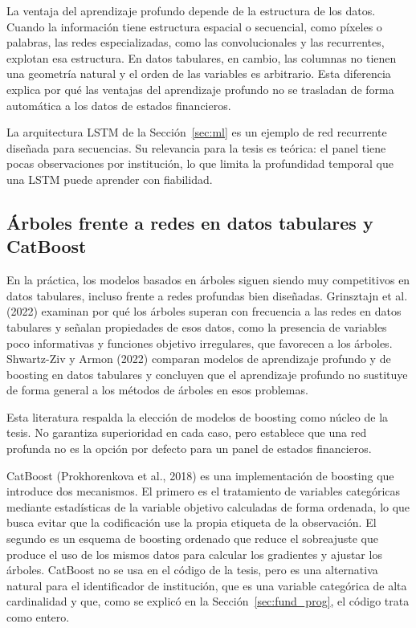 La ventaja del aprendizaje profundo depende de la estructura de los datos. Cuando la información tiene estructura espacial o secuencial, como píxeles o palabras, las redes especializadas, como las convolucionales y las recurrentes, explotan esa estructura. En datos tabulares, en cambio, las columnas no tienen una geometría natural y el orden de las variables es arbitrario. Esta diferencia explica por qué las ventajas del aprendizaje profundo no se trasladan de forma automática a los datos de estados financieros.

La arquitectura LSTM de la Sección~\ref{sec:ml} es un ejemplo de red recurrente diseñada para secuencias. Su relevancia para la tesis es teórica: el panel tiene pocas observaciones por institución, lo que limita la profundidad temporal que una LSTM puede aprender con fiabilidad.

\subsection{Árboles frente a redes en datos tabulares y CatBoost}
En la práctica, los modelos basados en árboles siguen siendo muy competitivos en datos tabulares, incluso frente a redes profundas bien diseñadas. Grinsztajn et al. (2022) examinan por qué los árboles superan con frecuencia a las redes en datos tabulares y señalan propiedades de esos datos, como la presencia de variables poco informativas y funciones objetivo irregulares, que favorecen a los árboles. Shwartz-Ziv y Armon (2022) comparan modelos de aprendizaje profundo y de boosting en datos tabulares y concluyen que el aprendizaje profundo no sustituye de forma general a los métodos de árboles en esos problemas.

Esta literatura respalda la elección de modelos de boosting como núcleo de la tesis. No garantiza superioridad en cada caso, pero establece que una red profunda no es la opción por defecto para un panel de estados financieros.

CatBoost (Prokhorenkova et al., 2018) es una implementación de boosting que introduce dos mecanismos. El primero es el tratamiento de variables categóricas mediante estadísticas de la variable objetivo calculadas de forma ordenada, lo que busca evitar que la codificación use la propia etiqueta de la observación. El segundo es un esquema de boosting ordenado que reduce el sobreajuste que produce el uso de los mismos datos para calcular los gradientes y ajustar los árboles. CatBoost no se usa en el código de la tesis, pero es una alternativa natural para el identificador de institución, que es una variable categórica de alta cardinalidad y que, como se explicó en la Sección~\ref{sec:fund_prog}, el código trata como entero.

